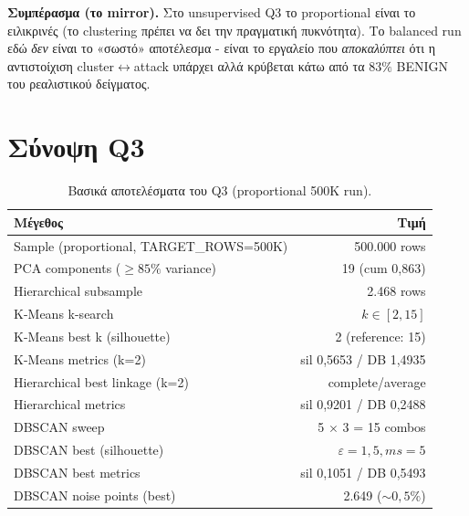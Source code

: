 \documentclass[12pt,a4paper,twoside]{book}
\begin{document}
\textbf{Συμπέρασμα (το mirror).} Στο
unsupervised Q3 το proportional είναι το ειλικρινές (το clustering πρέπει
να δει την πραγματική πυκνότητα). Το balanced run εδώ \emph{δεν} είναι το
«σωστό» αποτέλεσμα - είναι το εργαλείο που \emph{αποκαλύπτει} ότι η
αντιστοίχιση cluster\(\leftrightarrow\)attack υπάρχει αλλά κρύβεται κάτω από
τα \(83\%\) BENIGN του ρεαλιστικού δείγματος.

\section{Σύνοψη Q3}\label{sec:q3_summary}

\begin{table}[H]
    \centering
    \begin{tabular}{lr}
        \toprule
        \textbf{Μέγεθος}                                  & \textbf{Τιμή} \\
        \midrule
        Sample (proportional, TARGET\_ROWS=500K)          & 500.000 rows  \\
        PCA components (\(\geq 85\%\) variance)           & 19 (cum 0,863) \\
        Hierarchical subsample                            & 2.468 rows    \\
        K-Means k-search                                  & \(k \in [2,15]\) \\
        K-Means best k (silhouette)                       & 2 (reference: 15) \\
        K-Means metrics (k=2)                             & sil 0,5653 / DB 1,4935 \\
        Hierarchical best linkage (k=2)                   & complete/average \\
        Hierarchical metrics                              & sil 0,9201 / DB 0,2488 \\
        DBSCAN sweep                                      & 5 \(\times\) 3 = 15 combos \\
        DBSCAN best (silhouette)                          & \(\varepsilon=1{,}5, ms=5\) \\
        DBSCAN best metrics                               & sil 0,1051 / DB 0,5493 \\
        DBSCAN noise points (best)                        & 2.649 (\(\sim 0{,}5\%\)) \\
        \bottomrule
    \end{tabular}
    \caption{Βασικά αποτελέσματα του Q3 (proportional 500K run).}\label{tab:q3_summary}
\end{table}
\end{document}
